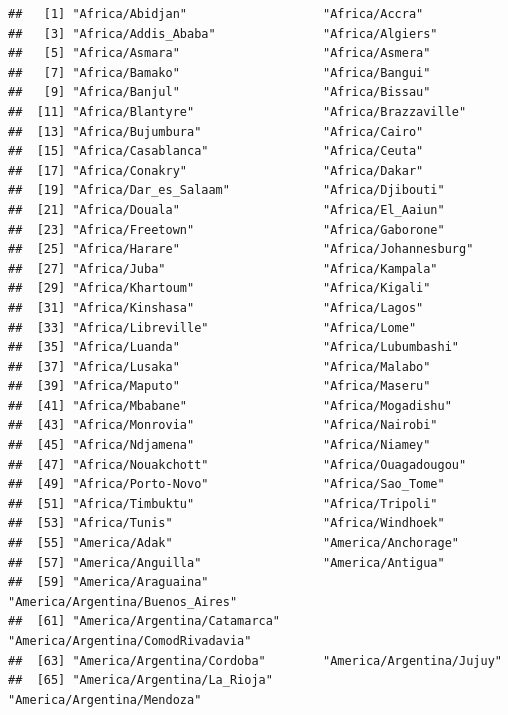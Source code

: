 \documentclass[
]{book}
\begin{document}
\begin{verbatim}
##   [1] "Africa/Abidjan"                   "Africa/Accra"                    
##   [3] "Africa/Addis_Ababa"               "Africa/Algiers"                  
##   [5] "Africa/Asmara"                    "Africa/Asmera"                   
##   [7] "Africa/Bamako"                    "Africa/Bangui"                   
##   [9] "Africa/Banjul"                    "Africa/Bissau"                   
##  [11] "Africa/Blantyre"                  "Africa/Brazzaville"              
##  [13] "Africa/Bujumbura"                 "Africa/Cairo"                    
##  [15] "Africa/Casablanca"                "Africa/Ceuta"                    
##  [17] "Africa/Conakry"                   "Africa/Dakar"                    
##  [19] "Africa/Dar_es_Salaam"             "Africa/Djibouti"                 
##  [21] "Africa/Douala"                    "Africa/El_Aaiun"                 
##  [23] "Africa/Freetown"                  "Africa/Gaborone"                 
##  [25] "Africa/Harare"                    "Africa/Johannesburg"             
##  [27] "Africa/Juba"                      "Africa/Kampala"                  
##  [29] "Africa/Khartoum"                  "Africa/Kigali"                   
##  [31] "Africa/Kinshasa"                  "Africa/Lagos"                    
##  [33] "Africa/Libreville"                "Africa/Lome"                     
##  [35] "Africa/Luanda"                    "Africa/Lubumbashi"               
##  [37] "Africa/Lusaka"                    "Africa/Malabo"                   
##  [39] "Africa/Maputo"                    "Africa/Maseru"                   
##  [41] "Africa/Mbabane"                   "Africa/Mogadishu"                
##  [43] "Africa/Monrovia"                  "Africa/Nairobi"                  
##  [45] "Africa/Ndjamena"                  "Africa/Niamey"                   
##  [47] "Africa/Nouakchott"                "Africa/Ouagadougou"              
##  [49] "Africa/Porto-Novo"                "Africa/Sao_Tome"                 
##  [51] "Africa/Timbuktu"                  "Africa/Tripoli"                  
##  [53] "Africa/Tunis"                     "Africa/Windhoek"                 
##  [55] "America/Adak"                     "America/Anchorage"               
##  [57] "America/Anguilla"                 "America/Antigua"                 
##  [59] "America/Araguaina"                "America/Argentina/Buenos_Aires"  
##  [61] "America/Argentina/Catamarca"      "America/Argentina/ComodRivadavia"
##  [63] "America/Argentina/Cordoba"        "America/Argentina/Jujuy"         
##  [65] "America/Argentina/La_Rioja"       "America/Argentina/Mendoza"       

\end{verbatim}
\end{document}
